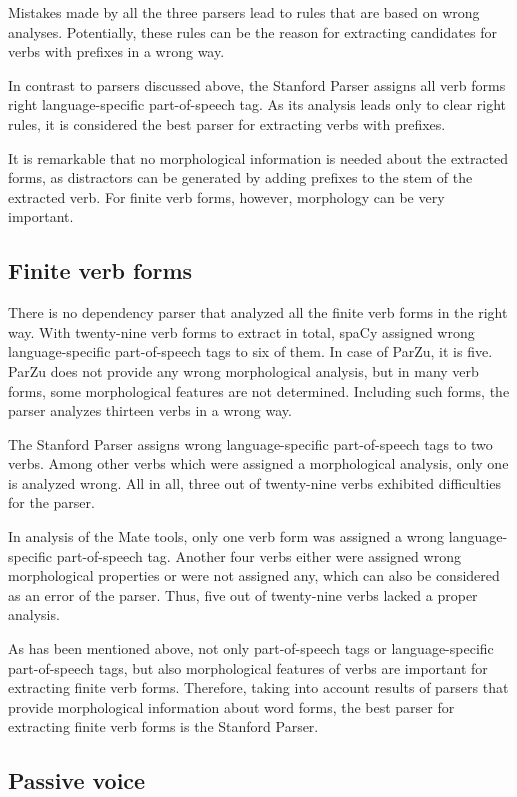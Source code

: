 Mistakes made by all the three parsers lead to rules that are based on wrong analyses. Potentially, these rules can be the reason for extracting candidates for verbs with prefixes in a wrong way.

In contrast to parsers discussed above, the Stanford Parser assigns all verb forms right language-specific part-of-speech tag. As its analysis leads only to clear right rules, it is considered the best parser for extracting verbs with prefixes.

It is remarkable that no morphological information is needed about the extracted forms, as distractors can be generated by adding prefixes to the stem of the extracted verb. For finite verb forms, however, morphology can be very important.

\subsection{Finite verb forms}

There is no dependency parser that analyzed all the finite verb forms in the right way. With twenty-nine verb forms to extract in total, spaCy assigned wrong language-specific part-of-speech tags to six of them. In case of ParZu, it is five. ParZu does not provide any wrong morphological analysis, but in many verb forms, some morphological features are not determined. Including such forms, the parser analyzes thirteen verbs in a wrong way.

The Stanford Parser assigns wrong language-specific part-of-speech tags to two verbs. Among other verbs which were assigned a morphological analysis, only one is analyzed wrong. All in all, three out of twenty-nine verbs exhibited difficulties for the parser.

In analysis of the Mate tools, only one verb form was assigned a wrong language-specific part-of-speech tag. Another four verbs either were assigned wrong morphological properties or were not assigned any, which can also be considered as an error of the parser. Thus, five out of twenty-nine verbs lacked a proper analysis.

As has been mentioned above, not only part-of-speech tags or language-specific part-of-speech tags, but also morphological features of verbs are important for extracting finite verb forms. Therefore, taking into account results of parsers that provide morphological information about word forms, the best parser for extracting finite verb forms is the Stanford Parser.

\subsection{Passive voice}

